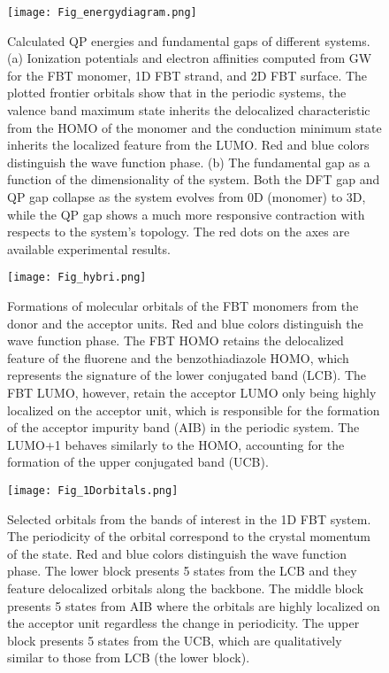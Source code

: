 \documentclass[journal = jpclcd]{achemso}
\begin{document}
\begin{figure}[H]
    \centering
    \texttt{[image: Fig\_energydiagram.png]}
    \caption{Calculated QP energies and fundamental gaps of different systems. (a) Ionization potentials and electron affinities computed from GW for the FBT monomer, 1D FBT strand, and 2D FBT surface. The plotted frontier orbitals show that in the periodic systems, the valence band maximum state inherits the delocalized characteristic from the HOMO of the monomer and the conduction minimum state inherits the localized feature from the LUMO. Red and blue colors distinguish the wave function phase. (b) The fundamental gap as a function of the dimensionality of the system. Both the DFT gap and QP gap collapse as the system evolves from 0D (monomer) to 3D, while the QP gap shows a much more responsive contraction with respects to the system's topology. The red dots on the axes are available experimental results.\cite{Mai2015}} 
    \label{Fig_EnergyDiagram}
\end{figure}

\begin{figure}[H]
    \centering
    \texttt{[image: Fig\_hybri.png]}
    \caption{Formations of molecular orbitals of the FBT monomers from the donor and the acceptor units. Red and blue colors distinguish the wave function phase. The FBT HOMO retains the delocalized feature of the fluorene and the benzothiadiazole HOMO, which represents the signature of the lower conjugated band (LCB). The FBT LUMO, however, retain the acceptor LUMO only being highly localized on the acceptor unit, which is responsible for the formation of the acceptor impurity band (AIB) in the periodic system. The LUMO+1 behaves similarly to the HOMO, accounting for the formation of the upper conjugated band (UCB).} 
    \label{Fig_Hybri}
\end{figure}

\begin{figure}[H]
    \centering
    \texttt{[image: Fig\_1Dorbitals.png]}
    \caption{Selected orbitals from the bands of interest in the 1D FBT system. The periodicity of the orbital correspond to the crystal momentum of the state. Red and blue colors distinguish the wave function phase. The lower block presents 5 states from the LCB and they feature delocalized orbitals along the backbone. The middle block presents 5 states from AIB where the orbitals are highly localized on the acceptor unit regardless the change in periodicity. The upper block presents 5 states from the UCB, which are qualitatively similar to those from LCB (the lower block).} 
    \label{Fig_1Dorbitals}
\end{figure}
\end{document}

